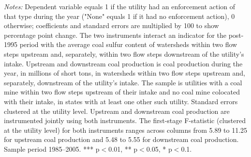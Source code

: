 \begin{table}[htbp]
\begin{minipage}{\linewidth}
\raggedright
\textit{Notes:} Dependent variable equals 1 if the utility had an enforcement action of that type during the year ("None" equals 1 if it had no enforcement action), 0 otherwise; coefficients and standard errors are multiplied by 100 to show percentage point change. The two instruments interact an indicator for the post-1995 period with the average coal sulfur content of watersheds within two flow steps upstream and, separately, within two flow steps downstream of the utility's intake. Upstream and downstream coal production is coal production during the year, in millions of short tons, in watersheds within two flow steps upstream and, separately, downstream of the utility's intake. The sample is utilities with a coal mine within two flow steps upstream of their intake and no coal mine colocated with their intake, in states with at least one other such utility. Standard errors clustered at the utility level. Upstream and downstream coal production are instrumented jointly using both instruments. The first-stage F-statistic (clustered at the utility level) for both instruments ranges across columns from 5.89 to 11.25 for upstream coal production and 5.48 to 5.55 for downstream coal production. Sample period 1985--2005. *** p$<$0.01, ** p$<$0.05, * p$<$0.1.
\end{minipage}
\end{table}
